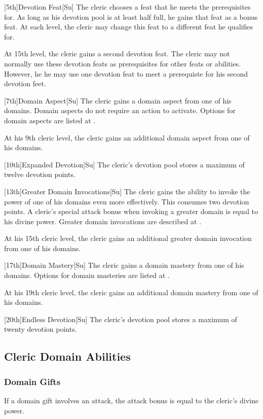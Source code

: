 [5th]{Devotion Feat}[Su]
The cleric chooses a feat that he meets the prerequisites for.
As long as his devotion pool is at least half full, he gains that feat as a bonus feat.
At each level, the cleric may change this feat to a different feat he qualifies for.

At 15th level, the cleric gains a second devotion feat.
The cleric may not normally use these devotion feats as prerequisites for other feats or abilities.
However, he he may use one devotion feat to meet a prerequiste for his second devotion feet.

[7th]{Domain Aspect}[Su]
The cleric gains a domain aspect from one of his domains.
Domain aspects do not require an action to activate.
Options for domain aspects are listed at .

At his 9th cleric level, the cleric gains an additional domain aspect from one of his domains.

[10th]{Expanded Devotion}[Su]
The cleric's devotion pool stores a maximum of twelve devotion points.

[13th]{Greater Domain Invocations}[Su]
The cleric gains the ability to invoke the power of one of his domains even more effectively.
This consumes two devotion points.
A cleric's special attack bonus when invoking a greater domain is equal to his divine power.
Greater domain invocations are described at .

At his 15th cleric level, the cleric gains an additional greater domain invocation from one of his domains.

[17th]{Domain Mastery}[Su]
The cleric gains a domain mastery from one of his domains.
Options for domain masteries are listed at .

At his 19th cleric level, the cleric gains an additional domain mastery from one of his domains.

[20th]{Endless Devotion}[Su]
The cleric's devotion pool stores a maximum of twenty devotion points.

\subsection{Cleric Domain Abilities}

\subsubsection{Domain Gifts}\label{Domain Gifts}
If a domain gift involves an attack, the attack bonus is equal to the cleric's divine power.

